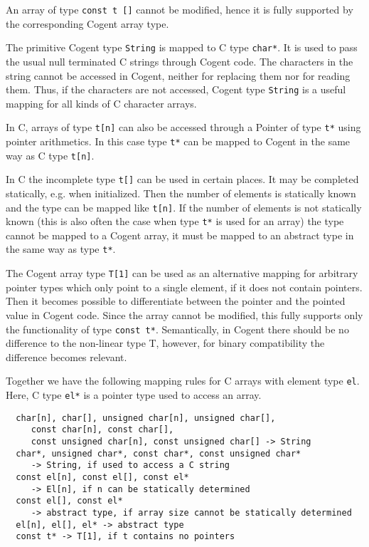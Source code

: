 \documentclass[a4paper]{report}
\newcommand{\code}[1]{\textnormal{\texttt{#1}}}
\begin{document}
An array of type \code{const t []} cannot be modified, hence it is fully supported by the corresponding 
Cogent array type.

The primitive Cogent type \code{String} is mapped to C type \code{char*}. It is used to pass the usual 
null terminated C strings through Cogent code. The characters in the string cannot be accessed in Cogent, 
neither for replacing them nor for reading them. Thus, if the characters are not accessed, Cogent type
\code{String} is a useful mapping for all kinds of C character arrays.

In C, arrays of type \code{t[n]} can also be accessed through a Pointer of type \code{t*} using pointer
arithmetics. In this case type \code{t*} can be mapped to Cogent in the same way as C type \code{t[n]}.

In C the incomplete type \code{t[]} can be used in certain places. It may be completed statically, e.g. 
when initialized. Then the number of elements is statically known and the type can be mapped like \code{t[n]}.
If the number of elements is not statically known (this is also often the case when type \code{t*} 
is used for an array) the type cannot be mapped to a Cogent array, it must be mapped to an abstract type in
the same way as type \code{t*}.

The Cogent array type \code{T[1]} can be used as an alternative mapping for arbitrary pointer types which 
only point to a single element, if it does not contain pointers. Then it becomes possible to differentiate 
between the pointer and the pointed value in Cogent code. Since the array cannot be modified, this fully 
supports only the functionality of type \code{const t*}. Semantically, in Cogent there should be no difference 
to the non-linear type T, however, for binary compatibility the difference becomes relevant.

Together we have the following mapping rules for C arrays with element type \code{el}. Here, C type \code{el*} 
is a pointer type used to access an array.
\begin{verbatim}
  char[n], char[], unsigned char[n], unsigned char[], 
     const char[n], const char[],
     const unsigned char[n], const unsigned char[] -> String
  char*, unsigned char*, const char*, const unsigned char* 
     -> String, if used to access a C string
  const el[n], const el[], const el* 
     -> El[n], if n can be statically determined
  const el[], const el* 
     -> abstract type, if array size cannot be statically determined
  el[n], el[], el* -> abstract type
  const t* -> T[1], if t contains no pointers
\end{verbatim}
\end{document}
